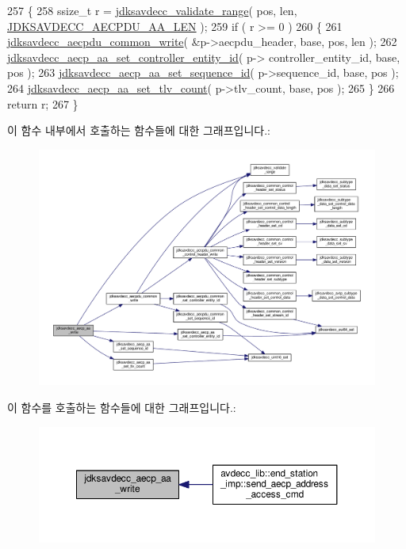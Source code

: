 \begin{DoxyCode}
257 \{
258     ssize\_t r = \hyperlink{group__util_ga9c02bdfe76c69163647c3196db7a73a1}{jdksavdecc\_validate\_range}( pos, len, 
      \hyperlink{group___a_e_c_p___a_a__offsets_ga624792b524d0f0f8ef18c2f4895003aa}{JDKSAVDECC\_AECPDU\_AA\_LEN} );
259     \textcolor{keywordflow}{if} ( r >= 0 )
260     \{
261         \hyperlink{group__aecpdu__common_gac85377ae2518276697173afa5db77526}{jdksavdecc\_aecpdu\_common\_write}( &p->aecpdu\_header, base, pos, len );
262         \hyperlink{group___a_e_c_p___a_a_ga16a3ac69955243c9eee453d51b6dc28a}{jdksavdecc\_aecp\_aa\_set\_controller\_entity\_id}( p->
      controller\_entity\_id, base, pos );
263         \hyperlink{group___a_e_c_p___a_a_ga140e64fcf3dbe04b722842e2b14ec27e}{jdksavdecc\_aecp\_aa\_set\_sequence\_id}( p->sequence\_id, base, pos );
264         \hyperlink{group___a_e_c_p___a_a_ga7e891867e553b3ff8e0e247629831afe}{jdksavdecc\_aecp\_aa\_set\_tlv\_count}( p->tlv\_count, base, pos );
265     \}
266     \textcolor{keywordflow}{return} r;
267 \}
\end{DoxyCode}


이 함수 내부에서 호출하는 함수들에 대한 그래프입니다.\+:
\nopagebreak
\begin{figure}[H]
\begin{center}
\leavevmode
\includegraphics[width=350pt]{group___a_e_c_p___a_a_ga63d1243cc1c62ab7cc8c4944a1fd2c37_cgraph}
\end{center}
\end{figure}




이 함수를 호출하는 함수들에 대한 그래프입니다.\+:
\nopagebreak
\begin{figure}[H]
\begin{center}
\leavevmode
\includegraphics[width=350pt]{group___a_e_c_p___a_a_ga63d1243cc1c62ab7cc8c4944a1fd2c37_icgraph}
\end{center}
\end{figure}


